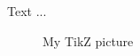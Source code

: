 \documentclass{book}
\begin{document}
Text ...
\begin{figure}
  \caption{My TikZ picture}
  \label{fig:tikz:my}
\end{figure}
\end{document}
